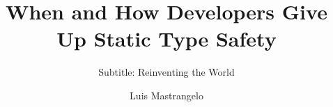 \documentclass[]{usiinfthesis}
\title{When and How \lang{Java} Developers Give Up Static Type Safety} %
\subtitle{Subtitle: Reinventing the World} %
\author{Luis Mastrangelo} %
\begin{document}
\def\thesis{}
\ifdefined\thesis

\maketitle %
\frontmatter %




\tableofcontents 
\listoffigures %
\listoftables %

\mainmatter







\appendix %



\backmatter

\else

\fi




\end{document}
